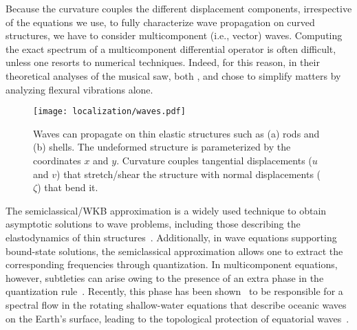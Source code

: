 %

Because the curvature couples the different displacement components, irrespective of the equations we use, to fully characterize wave propagation on curved structures, we have to consider multicomponent (i.e., vector) waves.
Computing the exact spectrum of a multicomponent differential operator is often difficult, unless one resorts to numerical techniques.
Indeed, for this reason, in their theoretical analyses of the musical saw, both \citet{scott1992}, and \citet{shankar2022} chose to simplify matters by analyzing flexural vibrations alone.
%
\begin{figure}
  \begin{center}
    \texttt{[image: localization/waves.pdf]}
  \end{center}
  \caption{
    Waves can propagate on thin elastic structures such as (a) rods and (b) shells.
    The undeformed structure is parameterized by the coordinates $x$ and $y$.
    Curvature couples tangential displacements ($u$ and $v$) that stretch/shear the structure with normal displacements ($\zeta$) that bend it.
  }
  \label{fig:waves}
\end{figure}

The semiclassical/WKB approximation is a widely used technique to obtain asymptotic solutions to wave problems, including those describing the elastodynamics of thin structures~\cite{pierce1970,nielsen2014,sndergaard2016,mohammed2021}.
Additionally, in wave equations supporting bound-state solutions, the semiclassical approximation allows one to extract the corresponding frequencies through quantization.
In multicomponent equations, however, subtleties can arise owing to the presence of an extra phase in the quantization rule~\cite{yabana1986,kaufman1987,littlejohn1991,littlejohn1991a}.
Recently, this phase has been shown~\cite{venaille2023} to be responsible for a spectral flow in the rotating shallow-water equations that describe oceanic waves on the Earth's surface, leading to the topological protection of equatorial waves~\cite{delplace2017}.


